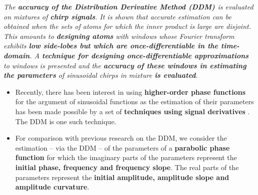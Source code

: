 \documentclass[plainsections,landscape]{sciposter}
\newcommand{\myinnercolsep}{1cm}
\newcommand{\mytcbtitlewrap}[1]{{\parbox[bottom][1.5cm][c]{\linewidth}{#1}}}
\begin{document}
\setlength{\columnseprule}{0pt}
\begin{multicols}{3}

\begin{tcolorbox}[title=\mytcbtitlewrap{Abstract}]
\setlength{\columnsep}{\myinnercolsep}
\begin{multicols}{2}
    \textit{%
        The \textbf{accuracy of the Distribution Derivative Method (DDM)
    \cite{betser2009sinusoidal}} is evaluated on mixtures of \textbf{chirp
    signals}. It is
    shown that accurate estimation can be obtained when the sets of atoms for
    which the inner product is large are disjoint.  This amounts to \textbf{designing
    atoms} with windows whose Fourier transform exhibits \textbf{low side-lobes but which
    are once-differentiable in the time-domain}. A \textbf{technique for designing
    once-differentiable approximations} to windows is presented and the \textbf{accuracy
    of these windows in estimating the parameters} of sinusoidal chirps in
    mixture \textbf{is evaluated}.}
\end{multicols}
\end{tcolorbox}

    \begin{tcolorbox}[title=\mytcbtitlewrap{Introduction}]
\setlength{\columnsep}{\myinnercolsep}
\begin{multicols}{2}
\label{sec:intro}
    \begin{itemize}
        \item{Recently, there has
            been interest in using \textbf{higher-order phase functions} for the argument of sinusoidal
    functions \cite{xuepiecewise} as the estimation of
their parameters has been made possible by a set of \textbf{techniques 
            using signal derivatives} \cite{hamilton2012unified}. The DDM is one
            such technique.}

        \item{For comparison with previous research on the DDM, we consider the estimation -- via the DDM -- of the parameters of a
            \textbf{parabolic phase function} for which the imaginary parts of the parameters
            represent the \textbf{initial phase, frequency and frequency slope}. The real parts
    of the parameters represent the \textbf{initial amplitude, amplitude slope and
            amplitude curvature}.}

        \vspace{1cm}


\end{itemize}
\end{multicols}
\end{tcolorbox}
\end{multicols}
\end{document}
